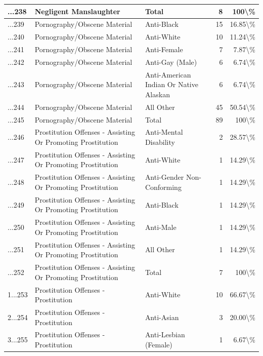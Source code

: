 \documentclass[
]{krantz}
\begin{document}
\begin{longtable}[t]{l|l|l|r|r}
\hline
...238 & Negligent Manslaughter & Total & 8 & 100\textbackslash{}\%\\
\hline
...239 & Pornography/Obscene Material & Anti-Black & 15 & 16.85\textbackslash{}\%\\
\hline
...240 & Pornography/Obscene Material & Anti-White & 10 & 11.24\textbackslash{}\%\\
\hline
...241 & Pornography/Obscene Material & Anti-Female & 7 & 7.87\textbackslash{}\%\\
\hline
...242 & Pornography/Obscene Material & Anti-Gay (Male) & 6 & 6.74\textbackslash{}\%\\
\hline
...243 & Pornography/Obscene Material & Anti-American Indian Or Native Alaskan & 6 & 6.74\textbackslash{}\%\\
\hline
...244 & Pornography/Obscene Material & All Other & 45 & 50.54\textbackslash{}\%\\
\hline
...245 & Pornography/Obscene Material & Total & 89 & 100\textbackslash{}\%\\
\hline
...246 & Prostitution Offenses - Assisting Or Promoting Prostitution & Anti-Mental Disability & 2 & 28.57\textbackslash{}\%\\
\hline
...247 & Prostitution Offenses - Assisting Or Promoting Prostitution & Anti-White & 1 & 14.29\textbackslash{}\%\\
\hline
...248 & Prostitution Offenses - Assisting Or Promoting Prostitution & Anti-Gender Non-Conforming & 1 & 14.29\textbackslash{}\%\\
\hline
...249 & Prostitution Offenses - Assisting Or Promoting Prostitution & Anti-Black & 1 & 14.29\textbackslash{}\%\\
\hline
...250 & Prostitution Offenses - Assisting Or Promoting Prostitution & Anti-Male & 1 & 14.29\textbackslash{}\%\\
\hline
...251 & Prostitution Offenses - Assisting Or Promoting Prostitution & All Other & 1 & 14.29\textbackslash{}\%\\
\hline
...252 & Prostitution Offenses - Assisting Or Promoting Prostitution & Total & 7 & 100\textbackslash{}\%\\
\hline
1...253 & Prostitution Offenses - Prostitution & Anti-White & 10 & 66.67\textbackslash{}\%\\
\hline
2...254 & Prostitution Offenses - Prostitution & Anti-Asian & 3 & 20.00\textbackslash{}\%\\
\hline
3...255 & Prostitution Offenses - Prostitution & Anti-Lesbian (Female) & 1 & 6.67\textbackslash{}\%\\

\end{longtable}
\end{document}
